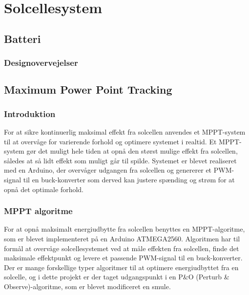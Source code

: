 \documentclass[../main.tex]{subfiles}
\begin{document}
\chapter{Solcellesystem} \label{Chap:Solcellesystem}

\section{Batteri}

    \subsection{Designovervejelser}

\section{Maximum Power Point Tracking}

    \subsection{Introduktion}

    For at sikre kontinuerlig maksimal effekt fra solcellen anvendes et MPPT-system til at overvåge for varierende forhold og optimere systemet i realtid. Et MPPT-system gør det muligt hele tiden at opnå den størst mulige effekt fra solcellen, således at så lidt effekt som muligt går til spilde. Systemet er blevet realiseret med en Arduino, der overvåger udgangen fra solcellen og genererer et PWM-signal til en buck-konverter som derved kan justere spænding og strøm for at opnå det optimale forhold. 

    \subsection{MPPT algoritme}

    For at opnå maksimalt energiudbytte fra solcellen benyttes en MPPT-algoritme, som er blevet implementeret på en Arduino ATMEGA2560. Algoritmen har til formål at overvåge solcellesystemet ved at måle effekten fra solcellen, finde det maksimale effektpunkt og levere et passende PWM-signal til en buck-konverter. Der er mange forskellige typer algoritmer til at optimere energiudbyttet fra en solcelle, og i dette projekt er der taget udgangspunkt i en P&O (Perturb & Observe)-algoritme, som er blevet modificeret en smule.
\end{document}
